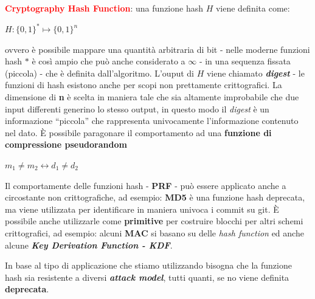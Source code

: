 \begin{flushleft}

    \textcolor{red}{\textbf{Cryptography Hash Function}}: una funzione hash $H$ viene definita come: 

    {\centering
        $H : \{0, 1\}^* \mapsto \{0, 1\}^n$
    \par}

    ovvero è possibile mappare una quantità arbitraria di bit - nelle moderne funzioni hash $*$ è così ampio che può anche considerato a $\infty$ - in una sequenza fissata (piccola) - che è definita dall'algoritmo. L'ouput di $H$ viene chiamato \textbf{\textit{digest}} - le funzioni di hash esistono anche per scopi non prettamente crittografici. La dimensione di \textbf{n} è scelta in maniera tale che sia altamente improbabile che due input differenti generino lo stesso output, in questo modo il \textit{digest} è un informazione ``piccola'' che rappresenta univocamente l'informazione contenuto nel dato. È possibile paragonare il comportamento ad una \textbf{funzione di compressione pseudorandom}

    {\centering
        $m_1 \neq m_2 \longleftrightarrow d_1 \neq d_2$
    \par}

    Il comportamente delle funzioni hash - \textbf{PRF} - può essere applicato anche a circostante non crittografiche, ad esempio: \textbf{MD5} è una funzione hash deprecata, ma viene utilizzata per identificare in maniera univoca i commit su git. È possibile anche utilizzarle come \textbf{primitive} per costruire blocchi per altri schemi crittografici, ad esempio: alcuni \textbf{MAC} si basano su delle \textit{hash function} ed anche alcune \textbf{\textit{Key Derivation Function - KDF}}.

    \medskip

    In base al tipo di applicazione che stiamo utilizzando bisogna che la funzione hash sia resistente a diversi \textbf{\textit{attack model}}, tutti quanti, se no viene definita \textbf{deprecata}.


\end{flushleft}
